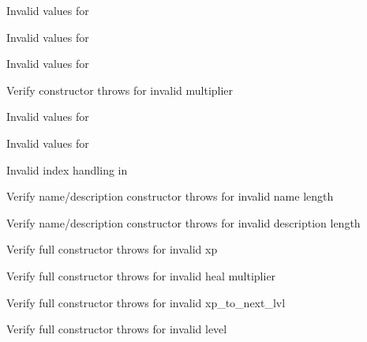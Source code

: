 \begin{DoxyRefList}
\label{test__test000032}%
%
Invalid values for   



\label{test__test000036}%
%
Invalid values for   



\label{test__test000041}%
%
Invalid values for   



\label{test__test000047}%
%
Verify constructor throws for invalid multiplier  



\label{test__test000049}%
%
Invalid values for   



\label{test__test000054}%
%
Invalid values for   



\label{test__test000060}%
%
Invalid index handling in   



\label{test__test000070}%
%
Verify name/description constructor throws for invalid name length  



\label{test__test000071}%
%
Verify name/description constructor throws for invalid description length  



\label{test__test000073}%
%
Verify full constructor throws for invalid xp  



\label{test__test000074}%
%
Verify full constructor throws for invalid heal multiplier  



\label{test__test000075}%
%
Verify full constructor throws for invalid xp\+\_\+to\+\_\+next\+\_\+lvl  



\label{test__test000076}%
%
Verify full constructor throws for invalid level  




\end{DoxyRefList}
